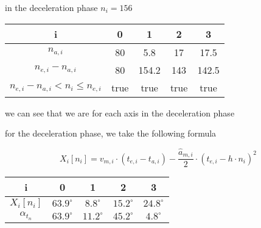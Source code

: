 \documentclass[%
  professionalfonts,%
  xcolor={%
    usenames,%
    dvipsnames,%
    svgnames,%
    table,%
    hyperref%
  }%
]{beamer}
\begin{document}
\begin{frame}
in the deceleration phase $n_i = 156$

\begin{center}
\begin{tabular}{ccccc}
\toprule
i & 0 & 1 & 2 & 3 \\
\midrule
$n_{a,i}$ & 80 & 5.8 & 17 & 17.5 \\ 
$n_{e,i} - n_{a,i}$ & 80 & 154.2 & 143 & 142.5 \\
$n_{e,i} - n_{a,i} < n_{i} \leq n_{e,i}$ & true  & true & true & true \\
\bottomrule 
\end{tabular}
\end{center}

we can see that we are for each axis in the deceleration phase

for the deceleration phase, we take the following formula

\begin{equation*}
X_{i}[n_{i}] = v_{m,i} \cdot (t_{e,i} - t_{a,i}) - \frac{\hat{a}_{m,i}}{2} \cdot (t_{e,i} - h \cdot n_{i})^2 
\end{equation*}

\begin{center}
\begin{tabular}{ccccc}
\toprule
i & 0 & 1 & 2 & 3 \\
\midrule
$X_{i}[n_{i}]$ & $63.9^\circ$ & $8.8^\circ$ & $15.2^\circ$ & $24.8^\circ$ \\
$\alpha_{t_{n}}$ & $63.9^\circ$ & $11.2^\circ$ & $45.2^\circ$ & $4.8^\circ$ \\
\bottomrule
\end{tabular}
\end{center} 
\end{frame}
\end{document}

